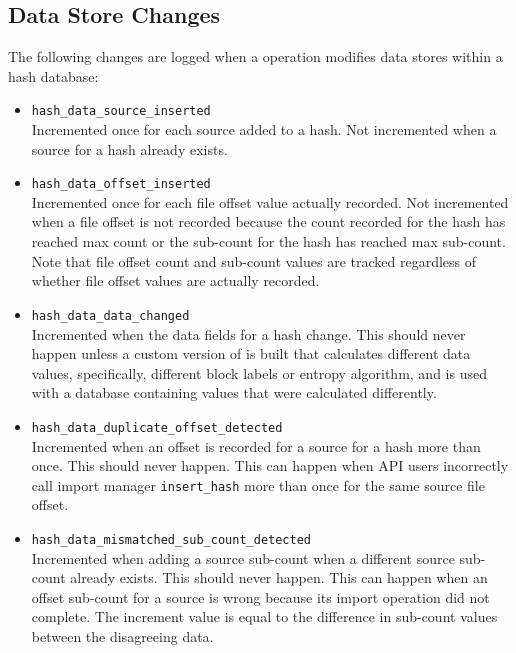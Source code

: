 \documentclass[11pt,fleqn]{article} %
\begin{document}
\subsection{Data Store Changes}
The following changes are logged when a \hdb operation modifies data stores within a hash database:
\begin{itemize}

\item \verb+hash_data_source_inserted+\\
Incremented once for each source added to a hash. Not incremented when a source for a hash already exists.
\item \verb+hash_data_offset_inserted+\\
Incremented once for each file offset value actually recorded. Not incremented when a file offset is not recorded because the count recorded for the hash has reached max count or the sub-count for the hash has reached max sub-count. Note that file offset count and sub-count values are tracked regardless of whether file offset values are actually recorded.
\item \verb+hash_data_data_changed+\\
Incremented when the data fields for a hash change. This should never happen unless a custom version of \hdb is built that calculates different data values, specifically, different block labels or entropy algorithm, and is used with a database containing values that were calculated differently.
\item \verb+hash_data_duplicate_offset_detected+\\
Incremented when an offset is recorded for a source for a hash more than once. This should never happen. This can happen when API users incorrectly call import manager \verb+insert_hash+ more than once for the same source file offset.
\item \verb+hash_data_mismatched_sub_count_detected+\\
Incremented when adding a source sub-count when a different source sub-count already exists. This should never happen. This can happen when an offset sub-count for a source is wrong because its import operation did not complete. The increment value is equal to the difference in sub-count values between the disagreeing data.


\end{itemize}
\end{document}
